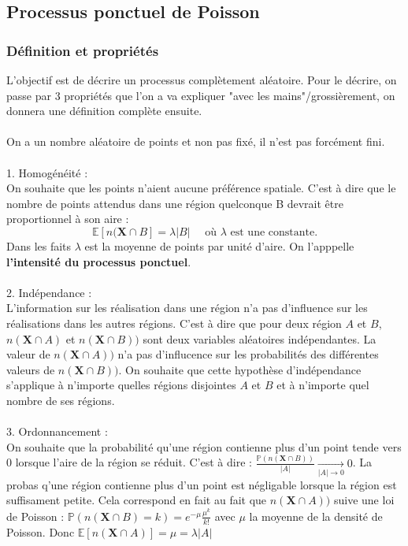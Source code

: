 \documentclass[12pt]{article}
\begin{document}
\subsection{Processus ponctuel de Poisson}

\subsubsection*{Définition et propriétés}
L'objectif est de décrire un processus complètement aléatoire. Pour le décrire, on passe par 3 propriétés que l'on a va expliquer "avec les mains"/grossièrement, on donnera une définition complète ensuite.\\
\\
On a un nombre aléatoire de points et non pas fixé, il n'est pas forcément fini.\\
\\
1. Homogénéité :\\
On souhaite que les points n'aient aucune préférence spatiale. C'est à dire que le nombre de points attendus dans une région quelconque B devrait être proportionnel à son aire : 
\[
\mathbb{E}[n(\textbf{X}\cap B] = \lambda|B| \quad \text{ où } \lambda \text{ est une constante.} 
\] 
Dans les faits $\lambda$ est la moyenne de points par unité d'aire. On l'apppelle \textbf{l'intensité du processus ponctuel}.\\
\\
2. Indépendance :\\
L'information sur les réalisation dans une région n'a pas d'influence sur les réalisations dans les autres régions. C'est à dire que pour deux région $A$ et $B$, $n(\textbf{X}\cap A)$ et $n(\textbf{X}\cap B))$ sont deux variables aléatoires indépendantes. La valeur de $n(\textbf{X}\cap A))$ n'a pas d'influcence sur les probabilités des différentes valeurs de $n(\textbf{X}\cap B))$. On souhaite que cette hypothèse d'indépendance s'applique à n'importe quelles régions disjointes $A$ et $B$ et à n'importe quel nombre de ses régions.\\
\\
3. Ordonnancement :\\
On souhaite que la probabilité qu'une région contienne plus d'un point tende vers 0 lorsque l'aire de la région se réduit. C'est à dire :
$\frac{\mathbb{P}(n(\textbf{X}\cap B))}{|A|} \underset{|A|\to 0 }{\longrightarrow} 0$. La probas q'une région contienne plus d'un point est négligable lorsque la région est suffisament petite. Cela correspond en fait au fait que $n(\textbf{X}\cap A))$ suive une loi de Poisson : $\mathbb{P}(n(\textbf{X}\cap B)=k) = e^{-\mu}\frac{\mu^k}{k!}$ avec $\mu$ la moyenne de la densité de Poisson. Donc $\mathbb{E}[n(\textbf{X}\cap A)] = \mu = \lambda|A|$
\end{document}
